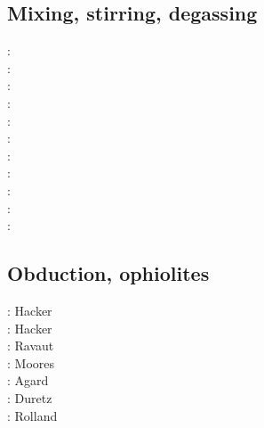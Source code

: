 \subsection{Mixing, stirring, degassing} 

\begin{scriptsize}
\nineteeneightyfour: \cite{olyb84}\\
\nineteenninety: \cite{ketu90}\\
\nineteenninetysix: \cite{pelt96}\\
\nineteenninetynine: \cite{cori99}\\
\twothousandone: \cite{huke01}\\
\twothousandtwo: \cite{vahb02}\\
\twothousandthree: \cite{fasa03}\cite{vabh03}\\
\twothousandfive: \cite{colt05}\\
\twothousandseven: \cite{gogc07}\cite{nake07}\cite{vabh07}\\
\twothousandeleven: \cite{lemj11}\cite{saad11}\\
\twothousandeighteen: \cite{onzh18}
\end{scriptsize}

\subsection{Obduction, ophiolites}
 

\begin{scriptsize}
\nineteenninety: Hacker \cite{hack90}\\
\nineteenninetyone: Hacker \cite{hack91}\\
\nineteenninetyseven: Ravaut \etal \cite{rabh97}\\
\twothousand: Moores \etal \cite{mokd00}\\
\twothousandfourteen: Agard \etal \cite{agzf14}\\
\twothousandsixteen: Duretz \etal \cite{duay16}\\
\twothousandtwenty: Rolland \etal \cite{rohb20}
\end{scriptsize}

